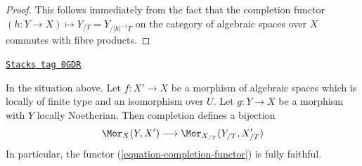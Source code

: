 \begin{proof}
This follows immediately from the fact that the completion functor
$(h : Y \to X) \mapsto Y_{/T} = Y_{/|h|^{-1}T}$
on the category of algebraic spaces over $X$
commutes with fibre products.
\end{proof}

\begin{lemma}
\label{restricted-lemma-completion-functor-fully-faithful}
\href{https://stacks.math.columbia.edu/tag/0GDR}{\texttt{Stacks tag 0GDR}}

In the situation above. Let $f : X' \to X$ be a morphism of algebraic spaces
which is locally of finite type and an isomorphism over $U$. Let
$g : Y \to X$ be a morphism with $Y$ locally Noetherian. Then completion
defines a bijection
$$
\Mor_X(Y, X') \longrightarrow \Mor_{X_{/T}}(Y_{/T}, X'_{/T})
$$
In particular, the functor (\ref{equation-completion-functor}) is
fully faithful.
\end{lemma}

